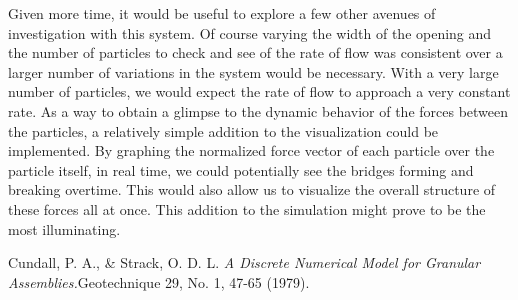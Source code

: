 \documentclass{article}%
\begin{document}
	Given more time, it would be useful to explore a few other avenues of investigation with this system. Of course varying the width of the opening and the number of particles to check and see of the rate of flow was consistent over a larger number of variations in the system would be necessary. With a very large number of particles, we would expect the rate of flow to approach a very constant rate. As a way to obtain a glimpse to the dynamic behavior of the forces between the particles, a relatively simple addition to the visualization could be implemented. By graphing the normalized force vector of each particle over the particle itself, in real time, we could potentially see the bridges forming and breaking overtime. This would also allow us to visualize the overall structure of these forces all at once. This addition to the simulation might prove to be the most illuminating.
	

\begin{thebibliography}{1}
	 Cundall, P. A., \& Strack, O. D. L. \textit{A Discrete Numerical Model for Granular Assemblies.}Geotechnique 29, No. 1, 47-65 (1979).
\end{thebibliography} 
\end{document}
